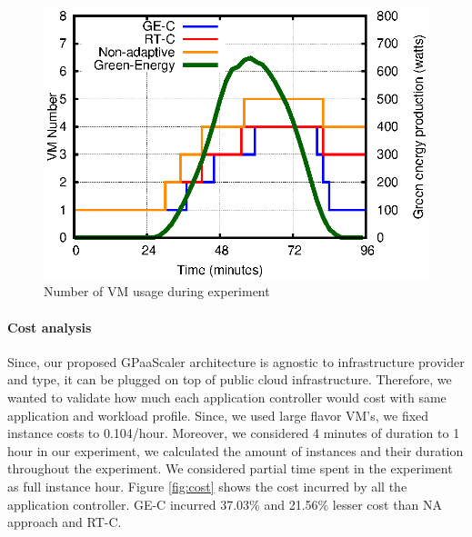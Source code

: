 \begin{figure} [htb]
\centering
\includegraphics[scale=.8]{Graphs/vm.eps}
\caption{Number of VM usage during experiment}
\label{fig:vm}
\end{figure}



\paragraph{\textbf{Cost analysis}}

Since, our proposed GPaaScaler architecture is agnostic to infrastructure provider and type, it can be plugged on top of public cloud infrastructure. Therefore, we wanted to validate how much each application controller would cost with same application and workload profile. Since, we used large flavor VM's, we fixed instance costs to 0.104\textdollar/hour. Moreover, we considered 4 minutes of duration to 1 hour in our experiment, we calculated the amount of instances and their duration throughout the experiment. We considered partial time spent in the experiment as full instance hour. Figure \ref{fig:cost} shows the cost incurred by all the application controller. GE-C incurred 37.03\% and 21.56\% lesser cost than NA approach and RT-C.

